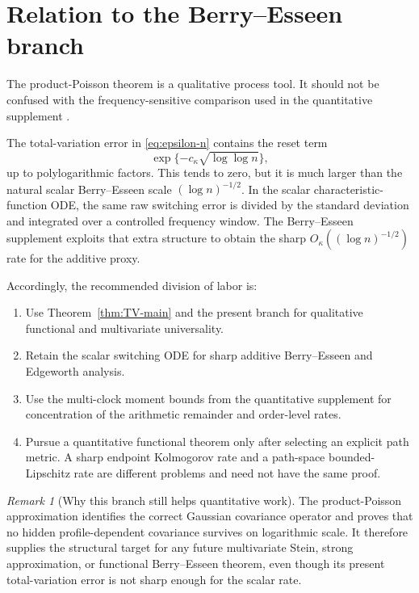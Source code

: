 \documentclass[11pt]{article}
\theoremstyle{definition}
\theoremstyle{remark}
\newtheorem{remark}[theorem]{Remark}
\begin{document}
\section{Relation to the Berry--Esseen branch}

The product-Poisson theorem is a qualitative process tool.  It should not be
confused with the frequency-sensitive comparison used in the quantitative
supplement \cite{LongBerry2026}.

The total-variation error in \eqref{eq:epsilon-n} contains the reset term
\[
 \exp\{-c_\kappa\sqrt{\log\log n}\},
\]
up to polylogarithmic factors.  This tends to zero, but it is much larger
than the natural scalar Berry--Esseen scale $(\log n)^{-1/2}$.  In the scalar
characteristic-function ODE, the same raw switching error is divided by the
standard deviation and integrated over a controlled frequency window.  The
Berry--Esseen supplement exploits that extra structure to obtain the sharp
$O_\kappa((\log n)^{-1/2})$ rate for the additive proxy.

Accordingly, the recommended division of labor is:

\begin{enumerate}[label=\textnormal{\arabic*.},leftmargin=2.2em]
\item Use Theorem~\ref{thm:TV-main} and the present branch for qualitative
functional and multivariate universality.

\item Retain the scalar switching ODE for sharp additive Berry--Esseen and
Edgeworth analysis.

\item Use the multi-clock moment bounds from the quantitative supplement for
concentration of the arithmetic remainder and order-level rates.

\item Pursue a quantitative functional theorem only after selecting an
explicit path metric.  A sharp endpoint Kolmogorov rate and a path-space
bounded-Lipschitz rate are different problems and need not have the same
proof.
\end{enumerate}

\begin{remark}[Why this branch still helps quantitative work]
The product-Poisson approximation identifies the correct Gaussian covariance
operator and proves that no hidden profile-dependent covariance survives on
logarithmic scale.  It therefore supplies the structural target for any
future multivariate Stein, strong approximation, or functional
Berry--Esseen theorem, even though its present total-variation error is not
sharp enough for the scalar rate.
\end{remark}
\end{document}
